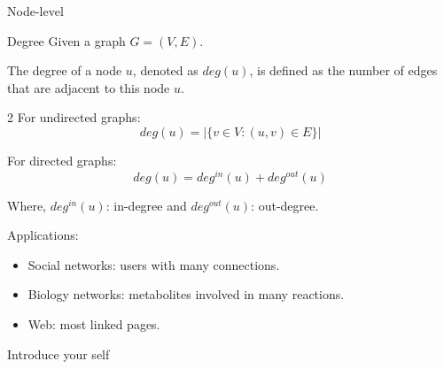 \documentclass{beamer}
\begin{document}
    \begin{frame}{Node-level}
        \begin{exampleblock}{Degree}
            Given a graph $G = (V, E)$.
            

            The degree of a node $u$, denoted as $deg(u)$, is defined as the number of edges that are adjacent to this node $u$.
            
            \begin{multicols}{2} %
                For undirected graphs:
                \begin{equation}
                    deg(u) = |\{v \in V : (u, v) \in E\}|
                    \label{eq:degree_undirected}
                \end{equation}
        
                For directed graphs:
                \begin{equation}
                    deg(u) = deg^{in}(u) + deg^{out}(u)
                    \label{eq:degree_directed}
                \end{equation}
            \end{multicols}
            
            Where, $deg^{in}(u)$: in-degree and $deg^{out}(u)$: out-degree. \newline


        \end{exampleblock}
        \vspace{-5mm}

        Applications:
        \begin{itemize}
            \item Social networks: users with many connections.
            \item Biology networks: metabolites involved in many reactions.
            \item Web: most linked pages.
        \end{itemize}

        \begin{note}
            {Introduce your self}
        \end{note}
    \end{frame}
\end{document}
